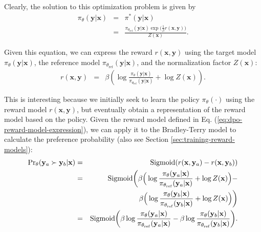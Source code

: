 Clearly, the solution to this optimization problem is given by
\begin{eqnarray}
\pi_{\theta}(\mathbf{y}|\mathbf{x}) & = & \pi^{*}(\mathbf{y}|\mathbf{x}) \nonumber \\
& = & \frac{\pi_{\theta_{\mathrm{ref}}}(\mathbf{y}|\mathbf{x}) \exp \big(\frac{1}{\beta} r(\mathbf{x},\mathbf{y}))}{Z(\mathbf{x})}.
\end{eqnarray}

Given this equation, we can express the reward $r(\mathbf{x},\mathbf{y})$ using the target model $\pi_{\theta}(\mathbf{y}|\mathbf{x})$, the reference model $\pi_{\theta_{\mathrm{ref}}}(\mathbf{y}|\mathbf{x})$, and the normalization factor $Z(\mathbf{x})$:
\begin{eqnarray}
r(\mathbf{x},\mathbf{y}) & = & \beta \left(\log \frac{\pi_{\theta}(\mathbf{y}|\mathbf{x})}{\pi_{\theta_{\mathrm{ref}}}(\mathbf{y}|\mathbf{x})} + \log Z(\mathbf{x}) \right). \label{eq:dpo-reward-model-expression}
\end{eqnarray}

This is interesting because we initially seek to learn the policy $\pi_{\theta}(\cdot)$ using the reward model $r(\mathbf{x},\mathbf{y})$, but eventually obtain a representation of the reward model based on the policy. Given the reward model defined in Eq. (\ref{eq:dpo-reward-model-expression}), we can apply it to the Bradley-Terry model to calculate the preference probability (also see Section \ref{sec:training-reward-models}):
\begin{eqnarray}
\mathrm{Pr}_{\theta}(\mathbf{y}_a \succ \mathbf{y}_b | \mathbf{x}) & = & \mathrm{Sigmoid}(r(\mathbf{x},\mathbf{y}_a)-r(\mathbf{x},\mathbf{y}_b)) \nonumber \\
& = & \mathrm{Sigmoid}\bigg(\beta \Big(\log \frac{\pi_{\theta}(\mathbf{y}_a|\mathbf{x})}{\pi_{\theta_{\mathrm{ref}}}(\mathbf{y}_a|\mathbf{x})} + \log Z(\mathbf{x}) \Big) - \nonumber \\
&    & \hspace{4.3em} \beta \Big(\log \frac{\pi_{\theta}(\mathbf{y}_b|\mathbf{x})}{\pi_{\theta_{\mathrm{ref}}}(\mathbf{y}_b|\mathbf{x})} + \log Z(\mathbf{x}) \Big) \bigg) \nonumber \\
& = & \mathrm{Sigmoid}\bigg( \beta \log \frac{\pi_{\theta}(\mathbf{y}_a|\mathbf{x})}{\pi_{\theta_{\mathrm{ref}}}(\mathbf{y}_a|\mathbf{x})}  - \beta \log \frac{\pi_{\theta}(\mathbf{y}_b|\mathbf{x})}{\pi_{\theta_{\mathrm{ref}}}(\mathbf{y}_b|\mathbf{x})} \bigg).
\end{eqnarray}

